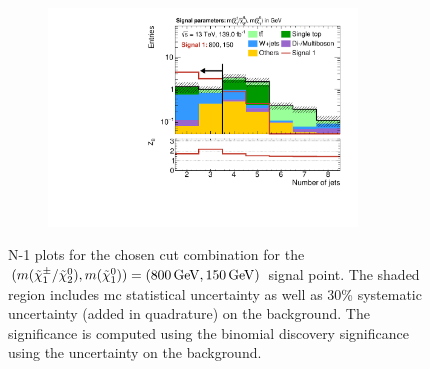 \begin{figure}
\begin{subfigure}[b]{0.5\linewidth}
	\end{subfigure}\hfill
	\begin{subfigure}[b]{0.5\linewidth}
		\centering\includegraphics[width=0.9\textwidth]{N-1_cut_scan/n1_800_150/nJet30}
	\end{subfigure}

	\caption[N-1 plots for the chosen cut combination for the (800, 150) signal point]{N-1 plots for the chosen cut combination for the $(m(\charg/\neutr), m(\lsp)) = (\SI{800}{\GeV}, \SI{150}{\GeV})$ signal point. The shaded region includes \gls{mc} statistical uncertainty as well as 30\% systematic uncertainty (added in quadrature) on the background. The significance is computed using the binomial discovery significance using the uncertainty on the background.}
	\label{fig:results_n1_800_150}
\end{figure}

